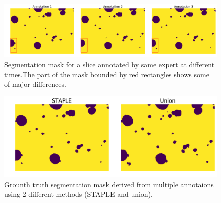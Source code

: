 \begin{figure}[h!] \label{fig:diffexperts}
  \includegraphics[width=1.0\linewidth]{figures/same_expert.pdf}
\caption{Segmentation mask for a slice annotated by same expert at different times.The part of the mask bounded by red rectangles shows some of major differences.}
\end{figure}

\begin{figure}[h!] \label{fig:ref}
\centering
 \includegraphics[width=0.7\linewidth]{figures/staple.pdf}
\caption{Grounth truth segmentation mask derived from multiple annotaions using 2 different methods (STAPLE and union).}
\end{figure}


